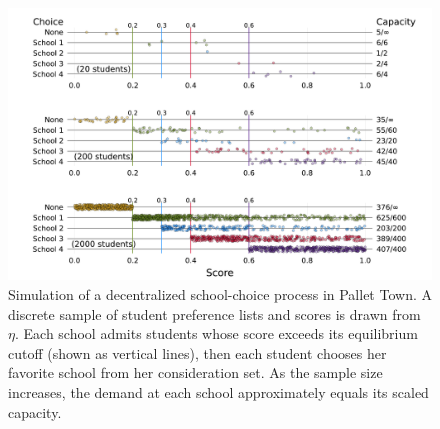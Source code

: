 \documentclass[12pt]{article}
\theoremstyle{definition}
\begin{document}
\begin{figure}
\begin{center}\includegraphics[width=\linewidth, ]{plots/score-cutoff-choice.pdf}\end{center}
\captionsetup{singlelinecheck=off}
    \caption[.]{Simulation of a decentralized school-choice process in Pallet Town. A discrete sample of student preference lists and scores is drawn from $\eta$. Each school admits students whose score exceeds its equilibrium cutoff (shown as vertical lines), then each student chooses her favorite school from her consideration set. As the sample size increases, the demand at each school approximately equals its scaled capacity.}
\label{score-cutoff-choice}
\end{figure}
\end{document}
